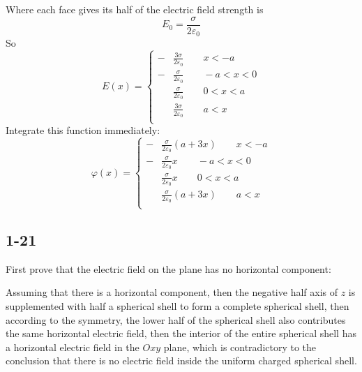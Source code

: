 \documentclass[a4paper,11pt]{amsart}
\theoremstyle{definition}
\begin{document}
\begin{figure}[htbp]
\begin{minipage}{0.49\textwidth}
		\end{minipage}
	\end{figure}
	Where each face gives its half of the electric field strength is
	\begin{equation}
		E_0=\dfrac{\sigma}{2\varepsilon_0}
	\end{equation}
	So
	$$
	E(x)=\left\{
		\begin{aligned}
			-&\frac{3\sigma}{2\varepsilon _0}\qquad x<-a\\
			-&\frac{\sigma}{2\varepsilon _0}\qquad -a<x<0\\
			&\frac{\sigma}{2\varepsilon _0}\qquad 0<x<a\\
			&\frac{3\sigma}{2\varepsilon _0}\qquad a<x\\
		\end{aligned}
	\right.
	$$
	Integrate this function immediately:
	$$
	\varphi(x)=\left\{
	\begin{aligned}
		-&\frac{\sigma}{2\varepsilon _0}\left( a+3x \right) \qquad x<-a\\
		-&\frac{\sigma}{2\varepsilon _0}x\qquad -a<x<0\\
		&\frac{\sigma}{2\varepsilon _0}x\qquad 0<x<a\\
		&\frac{\sigma}{2\varepsilon _0}\left( a+3x \right)\qquad a<x\\
	\end{aligned}
	\right.
	$$


	\subsection*{1-21}
	First prove that the electric field on the plane has no horizontal component:
	
	Assuming that there is a horizontal component, then the negative half axis of $z$ is supplemented with half a spherical shell to form a complete spherical shell, then according to the symmetry, the lower half of the spherical shell also contributes the same horizontal electric field, then the interior of the entire spherical shell has a horizontal electric field in the $Oxy$ plane, which is contradictory to the conclusion that there is no electric field inside the uniform charged spherical shell.
	
\end{document}
